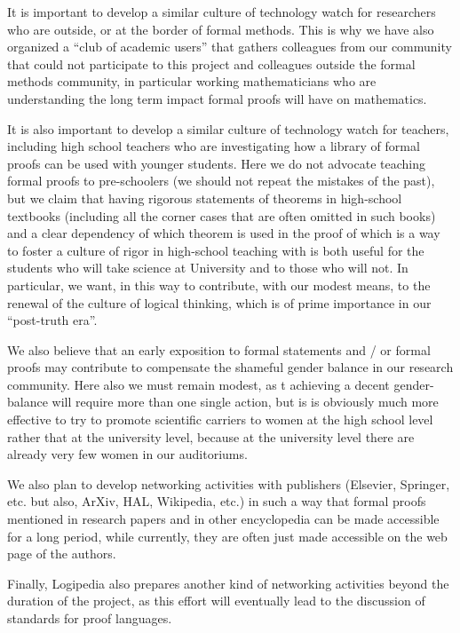 It is important to develop a similar culture of technology watch for
researchers who are outside, or at the border of formal methods.  This
is why we have also organized a ``club of academic users'' that
gathers colleagues from our community that could not participate to
this project and colleagues outside the formal methods community, in
particular working mathematicians who are understanding the long term
impact formal proofs will have on mathematics.

It is also important to develop a similar culture of technology watch
for teachers, including high school teachers who are investigating how
a library of formal proofs can be used with younger students. Here we
do not advocate teaching formal proofs to pre-schoolers (we should not
repeat the mistakes of the past), but we claim that having rigorous
statements of theorems in high-school textbooks (including all the
corner cases that are often omitted in such books) and a clear
dependency of which theorem is used in the proof of which is a way to
foster a culture of rigor in high-school teaching with is both useful
for the students who will take science at University and to those who
will not. In particular, we want, in this way to contribute, with our
modest means, to the renewal of the culture of logical thinking, which
is of prime importance in our ``post-truth era''.

We also believe that an early exposition to formal statements and / or
formal proofs may contribute to compensate the shameful gender balance
in our research community. Here also we must remain modest, as t
achieving a decent gender-balance will require more than one single
action, but is is obviously much more effective to try to promote
scientific carriers to women at the high school level rather that at
the university level, because at the university level there are
already very few women in our auditoriums.

We also plan to develop networking activities with publishers
(Elsevier, Springer, etc. but also, ArXiv, HAL, Wikipedia, etc.)  in
such a way that formal proofs mentioned in research papers and in
other encyclopedia can be made accessible for a long period, while
currently, they are often just made accessible on the web page of the
authors. 

Finally, Logipedia also prepares another kind of networking activities
beyond the duration of the project, as this effort will eventually
lead to the discussion of standards for proof languages. 

